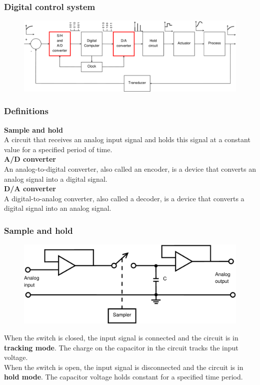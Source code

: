 \begin{frame}
	\frametitle{Digital control system}
	\begin{figure}
		\includegraphics[width=1\textwidth]{digital_control_system}
	\end{figure}
\end{frame}

\begin{frame}
	\frametitle{Definitions}
	\begin{block}{}
	\textbf{Sample and hold}\\
	A circuit that receives an analog input signal and holds this signal at a constant value for a specified period of time.\\
	\vspace{1em}
	\textbf{A/D converter}\\
	An analog-to-digital converter, also called an encoder, is a device that converts an analog signal into a digital signal.\\
	\vspace{1em} 
	\textbf{D/A converter}\\
	A digital-to-analog converter, also called a decoder, is a device that converts a digital signal into an analog signal.
\end{block}{}
\end{frame}

\begin{frame}
	\frametitle{Sample and hold}
	\begin{figure}
		\includegraphics[width=0.8\linewidth]{sample_hold}
	\end{figure}
	\vspace{-2ex}
	When the switch is closed, the input signal is connected and the circuit is in \textbf{tracking mode}. The charge on the capacitor in the circuit tracks the input voltage.\\
	When the switch is open, the input signal is disconnected and the circuit is in \textbf{hold mode}. The capacitor voltage holds constant for a specified time period.
\end{frame}

